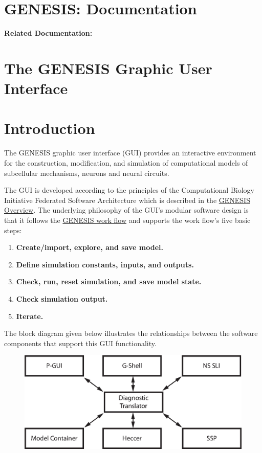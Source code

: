 \documentclass[12pt]{article}
\begin{document}
\section*{GENESIS: Documentation}

{\bf Related Documentation:}

\section*{The GENESIS Graphic User Interface}

\section*{Introduction}

The GENESIS graphic user interface (GUI) provides an interactive environment for the construction, modification, and simulation of computational models of subcellular mechanisms, neurons and neural circuits.

The GUI is developed according to the principles of the Computational Biology Initiative Federated Software Architecture which is described in the \href{../genesis-overview/genesis-overview.tex}{GENESIS Overview}. The underlying philosophy of the GUI's modular software design is that it follows the \href{../workflow-genesis/workflow-genesis.tex}{GENESIS work flow} and supports the work flow's five basic steps:
\begin{enumerate}
\item {\bf Create/import, explore, and save model.}
\item {\bf Define simulation constants, inputs, and outputs.}
\item {\bf Check, run, reset simulation, and save model state.}
\item {\bf Check simulation output.}
\item {\bf Iterate.}
\end{enumerate}
The block diagram given below illustrates the relationships between the software components that support this GUI functionality.

\begin{figure}[h]
  \centering
\includegraphics[scale=0.6]{figures/gui-isolated.eps}
  \label{fig:df-1}
\end{figure}
\end{document}
